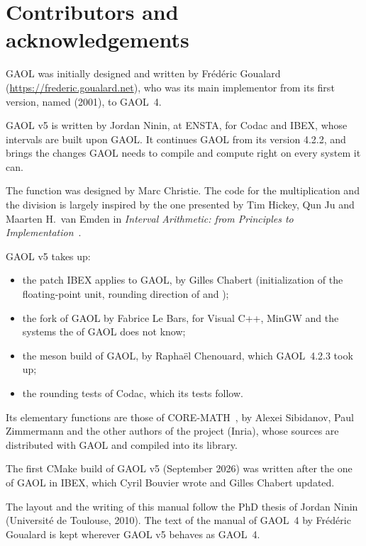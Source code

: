\chapter*{Contributors and acknowledgements}
\thispagestyle{plain}

GAOL was initially designed and written by Fr\'ed\'eric Goualard
(\url{https://frederic.goualard.net}), who was its main implementor from its
first version, named  (2001), to GAOL~4.

GAOL v5 is written by Jordan Ninin, at ENSTA, for Codac and IBEX, whose intervals are
built upon GAOL. It continues GAOL from its version 4.2.2, and brings the
changes GAOL needs to compile and compute right on every system it can.

\medskip
The function  was
designed by Marc Christie. The code for the multiplication and the division
is largely inspired by the one presented by Tim Hickey, Qun Ju and Maarten
H.\ van Emden in \emph{Interval Arithmetic: from Principles to
Implementation}~\cite{Hickey-Ju-vanEmden:2001}.

\medskip
GAOL v5 takes up:
\begin{itemize}
\item[$\bullet$] the patch IBEX applies to GAOL, by Gilles Chabert
  (initialization of the floating-point unit, rounding direction of
   and );
\item[$\bullet$] the fork of GAOL by Fabrice Le Bars, for Visual C++, MinGW
  and the systems the  of GAOL does not know;
\item[$\bullet$] the meson build of GAOL, by Rapha\"el Chenouard, which
  GAOL~4.2.3 took up;
\item[$\bullet$] the rounding tests of Codac, which its tests follow.
\end{itemize}

\medskip
\noindent
Its elementary functions are those of CORE-MATH~\cite{CoreMath:2022}, by
Alexei Sibidanov, Paul Zimmermann and the other authors of the project
(Inria), whose sources are distributed with GAOL and compiled into its
library.

\medskip
\noindent
The first CMake build of GAOL v5 (September 2026) was written after the one
of GAOL in IBEX, which Cyril Bouvier wrote and Gilles Chabert updated.

\medskip
\noindent
The layout and the writing of this manual follow the PhD thesis of Jordan
Ninin (Universit\'e de Toulouse, 2010). The text of the manual of GAOL~4 by
Fr\'ed\'eric Goualard is kept wherever GAOL v5 behaves as GAOL~4.
